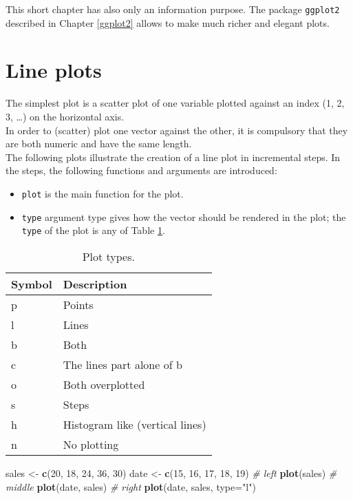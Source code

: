 \documentclass[]{book}
\newenvironment{Shaded}{}{}
\newcommand{\CommentTok}[1]{\textcolor[rgb]{0.38,0.63,0.69}{\textit{#1}}}
\newcommand{\DataTypeTok}[1]{\textcolor[rgb]{0.56,0.13,0.00}{#1}}
\newcommand{\DecValTok}[1]{\textcolor[rgb]{0.25,0.63,0.44}{#1}}
\newcommand{\KeywordTok}[1]{\textcolor[rgb]{0.00,0.44,0.13}{\textbf{#1}}}
\newcommand{\NormalTok}[1]{#1}
\newcommand{\StringTok}[1]{\textcolor[rgb]{0.25,0.44,0.63}{#1}}
\theoremstyle{definition}
\theoremstyle{definition}
\theoremstyle{definition}
\theoremstyle{remark}
\begin{document}
This short chapter has also only an information purpose. The package
\texttt{ggplot2} described in Chapter \ref{ggplot2} allows to make much
richer and elegant plots.

\hypertarget{line-plots}{%
\section{Line plots}\label{line-plots}}

The simplest plot is a scatter plot of one variable plotted against an
index (1, 2, 3, \ldots) on the horizontal axis.\\
In order to (scatter) plot one vector against the other, it is
compulsory that they are both numeric and have the same length.\\
The following plots illustrate the creation of a line plot in
incremental steps. In the steps, the following functions and arguments
are introduced:

\begin{itemize}
\item
  \texttt{plot} is the main function for the plot.
\item
  \texttt{type} argument type gives how the vector should be rendered in
  the plot; the \texttt{type} of the plot is any of Table
  \ref{tab:table-p-types}.
\end{itemize}

\begin{table}[t]

\caption{\label{tab:table-p-types}Plot types.}
\centering
\begin{tabular}{l|l}
\hline
Symbol & Description\\
\hline
p & Points\\
\hline
l & Lines\\
\hline
b & Both\\
\hline
c & The lines part alone of b\\
\hline
o & Both overplotted\\
\hline
s & Steps\\
\hline
h & Histogram like (vertical lines)\\
\hline
n & No plotting\\
\hline
\end{tabular}
\end{table}

\begin{Shaded}
\begin{Highlighting}[]
\NormalTok{sales <-}\StringTok{ }\KeywordTok{c}\NormalTok{(}\DecValTok{20}\NormalTok{, }\DecValTok{18}\NormalTok{, }\DecValTok{24}\NormalTok{, }\DecValTok{36}\NormalTok{, }\DecValTok{30}\NormalTok{)}
\NormalTok{date <-}\StringTok{ }\KeywordTok{c}\NormalTok{(}\DecValTok{15}\NormalTok{, }\DecValTok{16}\NormalTok{, }\DecValTok{17}\NormalTok{, }\DecValTok{18}\NormalTok{, }\DecValTok{19}\NormalTok{)}
\CommentTok{# left}
\KeywordTok{plot}\NormalTok{(sales)}
\CommentTok{# middle}
\KeywordTok{plot}\NormalTok{(date, sales)}
\CommentTok{# right}
\KeywordTok{plot}\NormalTok{(date, sales, }\DataTypeTok{type=}\StringTok{"l"}\NormalTok{)}
\end{Highlighting}
\end{Shaded}
\end{document}
